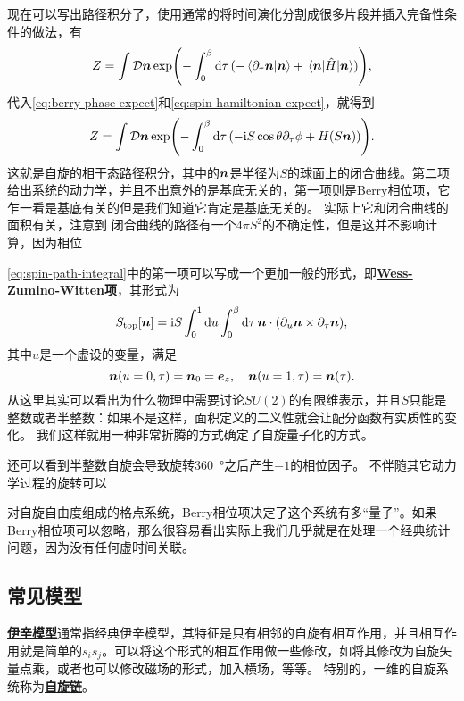 \documentclass[hyperref, UTF8, a4paper]{ctexart}
\newcommand*{\ii}{\mathrm{i}}
\newcommand*{\fd}[1]{\mathcal{D} #1}
\newcommand*{\concept}[1]{\underline{\textbf{#1}}}
\begin{document}
现在可以写出路径积分了，使用通常的将时间演化分割成很多片段并插入完备性条件的做法，有
\[
    Z = \int \fd{\vb*{n}} \exp(- \int_0^\beta \dd{\tau} (- \braket*{\partial_\tau \vb*{n}}{\vb*{n}} + \mel*{\vb*{n}}{\hat{H}}{\vb*{n}})),
\]
代入\eqref{eq:berry-phase-expect}和\eqref{eq:spin-hamiltonian-expect}，就得到
\begin{equation}
    Z = \int \fd{\vb*{n}} \exp(- \int_0^\beta \dd{\tau} (- \ii S \cos \theta \partial_\tau \phi + H(S \vb*{n}))).
    \label{eq:spin-path-integral}
\end{equation}
这就是自旋的相干态路径积分，其中的$\vb*{n}$是半径为$S$的球面上的闭合曲线。第二项给出系统的动力学，并且不出意外的是基底无关的，第一项则是Berry相位项，它乍一看是基底有关的但是我们知道它肯定是基底无关的。
实际上它和闭合曲线的面积有关，注意到
闭合曲线的路径有一个$4\pi S^2$的不确定性，但是这并不影响计算，因为相位

\eqref{eq:spin-path-integral}中的第一项可以写成一个更加一般的形式，即\concept{Wess-Zumino-Witten项}，其形式为
\begin{equation}
    S_\text{top}[\vb*{n}] = \ii S \int_0^1 \dd{u} \int_0^\beta \dd{\tau} \vb*{n} \cdot (\partial_{u} \vb*{n} \times \partial_\tau \vb*{n}),
\end{equation}
其中$u$是一个虚设的变量，满足
\begin{equation}
    \vb*{n}(u=0, \tau) = \vb*{n}_0 =  \vb*{e}_z, \quad \vb*{n}(u=1, \tau) = \vb*{n}(\tau).
\end{equation}
从这里其实可以看出为什么物理中需要讨论$SU(2)$的有限维表示，并且$S$只能是整数或者半整数：如果不是这样，面积定义的二义性就会让配分函数有实质性的变化。
我们这样就用一种非常折腾的方式确定了自旋量子化的方式。

还可以看到半整数自旋会导致旋转\SI{360}{\degree}之后产生$-1$的相位因子。
不伴随其它动力学过程的旋转可以 %

对自旋自由度组成的格点系统，Berry相位项决定了这个系统有多“量子”。如果Berry相位项可以忽略，那么很容易看出实际上我们几乎就是在处理一个经典统计问题，因为没有任何虚时间关联。

\subsection{常见模型}

\concept{伊辛模型}通常指经典伊辛模型，其特征是只有相邻的自旋有相互作用，并且相互作用就是简单的$s_i s_j$。可以将这个形式的相互作用做一些修改，如将其修改为自旋矢量点乘，或者也可以修改磁场的形式，加入横场，等等。
特别的，一维的自旋系统称为\concept{自旋链}。
\end{document}

